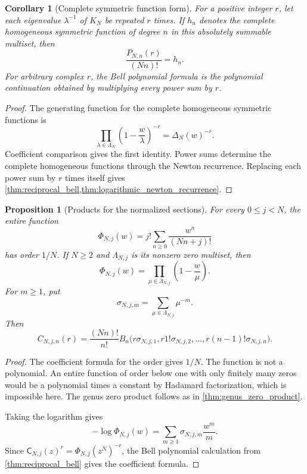 \documentclass{aomart}
\newtheorem{proposition}[proposition]{Proposition}
\newtheorem{corollary}[corollary]{Corollary}
\theoremstyle{definition}
\theoremstyle{remark}
\newcommand{\Cfun}{\mathsf C}
\begin{document}
\begin{corollary}[Complete symmetric function form]\label{cor:complete_symmetric_form}
For a positive integer $r$, let each eigenvalue $\lambda^{-1}$ of $K_N$ be repeated $r$ times.  If $h_n$ denotes the complete homogeneous symmetric function of degree $n$ in this absolutely summable multiset, then
\[
\frac{P_{N,n}(r)}{(Nn)!}=h_n.
\]
For arbitrary complex $r$, the Bell polynomial formula is the polynomial continuation obtained by multiplying every power sum by $r$.
\end{corollary}

\begin{proof}
The generating function for the complete homogeneous symmetric functions is
\[
\prod_{\lambda\in\Lambda_N}
\left(1-\frac w\lambda\right)^{-r}
=
\Delta_N(w)^{-r}.
\]
Coefficient comparison gives the first identity.  Power sums determine the complete homogeneous functions through the Newton recurrence.  Replacing each power sum by $r$ times itself gives \cref{thm:reciprocal_bell,thm:logarithmic_newton_recurrence}.
\end{proof}


\begin{proposition}[Products for the normalized sections]\label{prop:normalized_section_product}
For every $0\leq j<N$, the entire function
\[
\Phi_{N,j}(w)
=
j!\sum_{n\geq0}\frac{w^n}{(Nn+j)!}
\]
has order $1/N$.  If $N\geq2$ and $\Lambda_{N,j}$ is its nonzero zero multiset, then
\[
\Phi_{N,j}(w)
=
\prod_{\mu\in\Lambda_{N,j}}
\left(1-\frac w\mu\right).
\]
For $m\geq1$, put
\[
\sigma_{N,j,m}
=
\sum_{\mu\in\Lambda_{N,j}}\mu^{-m}.
\]
Then
\[
C_{N,j,n}(r)
=
\frac{(Nn)!}{n!}
B_n\bigl(
 r\sigma_{N,j,1},
 r1!\sigma_{N,j,2},
 \ldots,
 r(n-1)!\sigma_{N,j,n}
\bigr).
\]
\end{proposition}

\begin{proof}
The coefficient formula for the order gives $1/N$.  The function is not a polynomial.  An entire function of order below one with only finitely many zeros would be a polynomial times a constant by Hadamard factorization, which is impossible here.  The genus zero product follows as in \cref{thm:genus_zero_product}.

Taking the logarithm gives
\[
-\log\Phi_{N,j}(w)
=
\sum_{m\geq1}\sigma_{N,j,m}\frac{w^m}{m}.
\]
Since $\Cfun_{N,j}(z)^r=\Phi_{N,j}(z^N)^{-r}$, the Bell polynomial calculation from \cref{thm:reciprocal_bell} gives the coefficient formula.
\end{proof}
\end{document}
